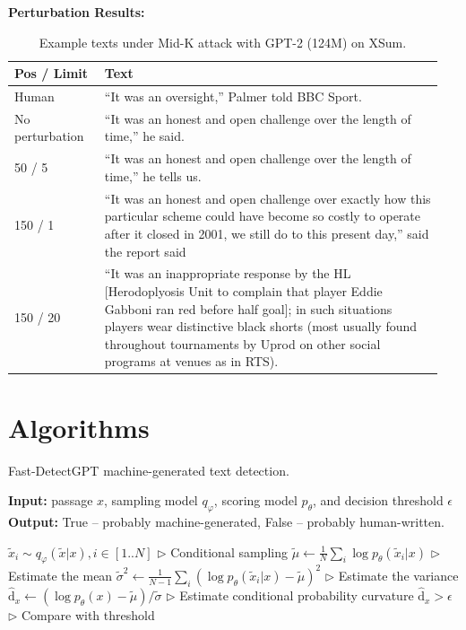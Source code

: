 \documentclass[11pt]{article}
\begin{document}
\begin{table}[H]
    \caption{Example texts under Mid-K attack with GPT-2 (124M) on XSum.}
    \label{tab:placeholder}
\vspace{1em}
\noindent
\textbf{Perturbation Results:}
\\
\begin{tabular}{|p{0.2\linewidth}|p{0.75\linewidth}|}
    \hline
    \textbf{Pos / Limit} & \textbf{Text} \\
    \hline
    Human & ``It was an oversight,'' Palmer told BBC Sport.\\
    \hline
    No perturbation & ``It was an honest and open challenge over the length of time,'' he said. \\
    \hline
    50 / 5 & ``It was an honest and open challenge over the length of time,'' he tells us.\\
    \hline
    150 / 1 & ``It was an honest and open challenge over exactly how this particular scheme could have become so costly to operate after it closed in 2001, we still do to this present day,'' said the report said\\
    \hline
    150 / 20 & ``It was an inappropriate response by the HL [Herodoplyosis Unit to complain that player Eddie Gabboni ran red before half goal]; in such situations players wear distinctive black shorts (most usually found throughout tournaments by Uprod on other social programs at venues as in RTS).\\
    \hline
\end{tabular}
\end{table}

\section{Algorithms}

\begin{algorithm*}[h]
  \caption{Fast-DetectGPT machine-generated text detection.}
  \textbf{Input:} passage $x$, sampling model $q_\varphi$, scoring model $p_\theta$, and decision threshold $\epsilon$ \\
  \textbf{Output:} True -- probably machine-generated, False -- probably human-written.
  \begin{algorithmic}[1]
    \label{alg:fastdetectgpt}
    \State $\tilde{x}_i \sim q_\varphi(\tilde{x}|x), i \in [1..N]$ \hfill $\triangleright$ Conditional sampling
    \State $\tilde{\mu} \leftarrow \frac{1}{N} \sum_i \log p_\theta(\tilde{x}_i|x)$ \hfill $\triangleright$ Estimate the mean
    \State $\tilde{\sigma}^2 \leftarrow \frac{1}{N-1} \sum_i (\log p_\theta(\tilde{x}_i|x) - \tilde{\mu})^2$ \hfill $\triangleright$ Estimate the variance
    \State $\hat{\mathrm{d}}_x \leftarrow (\log p_\theta(x) - \tilde{\mu})/\tilde{\sigma}$ \hfill $\triangleright$ Estimate conditional probability curvature
    \State \Return $\hat{\mathrm{d}}_x > \epsilon$ \hfill $\triangleright$ Compare with threshold
\EndFunction
\end{algorithmic}
\end{algorithm*}
\end{document}
